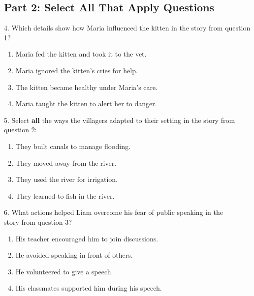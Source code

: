 \documentclass[12pt]{article}
\begin{document}
\vspace{1cm}

\subsection*{Part 2: Select All That Apply Questions}

4. Which details show how Maria influenced the kitten in the story from question 1?\\
\begin{enumerate}[label=\Alph*.]
    \item Maria fed the kitten and took it to the vet.  
    \item Maria ignored the kitten’s cries for help.  
    \item The kitten became healthy under Maria’s care.  
    \item Maria taught the kitten to alert her to danger.  
\end{enumerate}

\vspace{1cm}

5. Select \textbf{all} the ways the villagers adapted to their setting in the story from \\question 2:\\
\begin{enumerate}[label=\Alph*.]
    \item They built canals to manage flooding.  
    \item They moved away from the river.  
    \item They used the river for irrigation.  
    \item They learned to fish in the river.  
\end{enumerate}

\vspace{1cm}

6. What actions helped Liam overcome his fear of public speaking in the \\story from question 3?\\
\begin{enumerate}[label=\Alph*.]
    \item His teacher encouraged him to join discussions.  
    \item He avoided speaking in front of others.  
    \item He volunteered to give a speech.  
    \item His classmates supported him during his speech.  
\end{enumerate}
\end{document}
